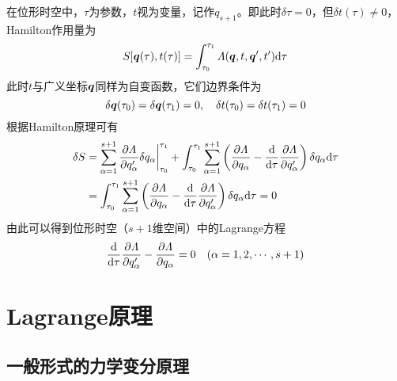 在位形时空中，$\tau$为参数，$t$视为变量，记作$q_{s+1}$。即此时$\delta \tau = 0$，但$\delta t(\tau) \neq 0$，Hamilton作用量为
\begin{equation}
	S[\boldsymbol{q}(\tau),t(\tau)] = \int_{\tau_0}^{\tau_1} \mathnormal{\Lambda}(\boldsymbol{q},t,\boldsymbol{q}',t') \mathrm{d} \tau
\end{equation}
此时$t$与广义坐标$\boldsymbol{q}$同样为自变函数，它们边界条件为
\begin{equation*}
	\delta \boldsymbol{q}(\tau_0) = \delta \boldsymbol{q}(\tau_1) = 0,\quad \delta t(\tau_0) = \delta t(\tau_1) = 0
\end{equation*}
根据Hamilton原理可有
\begin{align}
	\delta S & = \sum_{\alpha=1}^{s+1} \frac{\partial \mathnormal{\Lambda}}{\partial q'_\alpha} \delta q_\alpha\bigg|_{\tau_0}^{\tau_1} + \int_{\tau_0}^{\tau_1} \sum_{\alpha=1}^{s+1} \left(\frac{\partial \mathnormal{\Lambda}}{\partial q_\alpha} - \frac{\mathrm{d}}{\mathrm{d} \tau} \frac{\partial \mathnormal{\Lambda}}{\partial q'_\alpha}\right) \delta q_\alpha \mathrm{d} \tau \nonumber \\
	& = \int_{\tau_0}^{\tau_1} \sum_{\alpha=1}^{s+1} \left(\frac{\partial \mathnormal{\Lambda}}{\partial q_\alpha} - \frac{\mathrm{d}}{\mathrm{d} \tau} \frac{\partial \mathnormal{\Lambda}}{\partial q'_\alpha}\right) \delta q_\alpha \mathrm{d} \tau = 0
\end{align}
由此可以得到位形时空（$s+1$维空间）中的Lagrange方程
\begin{equation}
	\frac{\mathrm{d}}{\mathrm{d} \tau} \frac{\partial \mathnormal{\Lambda}}{\partial q'_\alpha} - \frac{\partial \mathnormal{\Lambda}}{\partial q_\alpha} = 0 \quad (\alpha = 1,2,\cdots,s+1)
\end{equation}

\section{Lagrange原理}

\subsection{一般形式的力学变分原理}

